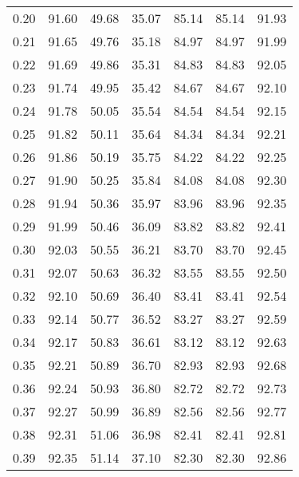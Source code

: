 \begin{tabular}{|c|c|c|c|c|c|c|}
      0.20 &     91.60 &     49.68 &      35.07 &   85.14 &      85.14 &         91.93 \\
      0.21 &     91.65 &     49.76 &      35.18 &   84.97 &      84.97 &         91.99 \\
      0.22 &     91.69 &     49.86 &      35.31 &   84.83 &      84.83 &         92.05 \\
      0.23 &     91.74 &     49.95 &      35.42 &   84.67 &      84.67 &         92.10 \\
      0.24 &     91.78 &     50.05 &      35.54 &   84.54 &      84.54 &         92.15 \\
      0.25 &     91.82 &     50.11 &      35.64 &   84.34 &      84.34 &         92.21 \\
      0.26 &     91.86 &     50.19 &      35.75 &   84.22 &      84.22 &         92.25 \\
      0.27 &     91.90 &     50.25 &      35.84 &   84.08 &      84.08 &         92.30 \\
      0.28 &     91.94 &     50.36 &      35.97 &   83.96 &      83.96 &         92.35 \\
      0.29 &     91.99 &     50.46 &      36.09 &   83.82 &      83.82 &         92.41 \\
      0.30 &     92.03 &     50.55 &      36.21 &   83.70 &      83.70 &         92.45 \\
      0.31 &     92.07 &     50.63 &      36.32 &   83.55 &      83.55 &         92.50 \\
      0.32 &     92.10 &     50.69 &      36.40 &   83.41 &      83.41 &         92.54 \\
      0.33 &     92.14 &     50.77 &      36.52 &   83.27 &      83.27 &         92.59 \\
      0.34 &     92.17 &     50.83 &      36.61 &   83.12 &      83.12 &         92.63 \\
      0.35 &     92.21 &     50.89 &      36.70 &   82.93 &      82.93 &         92.68 \\
      0.36 &     92.24 &     50.93 &      36.80 &   82.72 &      82.72 &         92.73 \\
      0.37 &     92.27 &     50.99 &      36.89 &   82.56 &      82.56 &         92.77 \\
      0.38 &     92.31 &     51.06 &      36.98 &   82.41 &      82.41 &         92.81 \\
      0.39 &     92.35 &     51.14 &      37.10 &   82.30 &      82.30 &         92.86 \\

\end{tabular}
